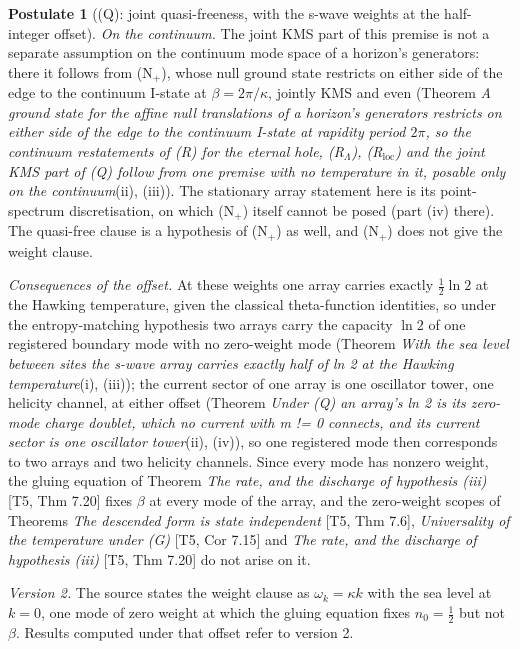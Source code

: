 \documentclass[11pt]{article}
\theoremstyle{definition}
\newtheorem{postulate}[theorem]{Postulate}
\theoremstyle{plain}
\begin{document}
\begin{postulate}[(Q): joint quasi-freeness, with the s-wave weights at the half-integer offset]
\emph{On the continuum.} The joint KMS part of this premise is not a separate assumption on the continuum mode space of a horizon's generators: there it follows from (N$_{+}$), whose null ground state restricts on either side of the edge to the continuum I-state at $\beta = 2\pi/\kappa$, jointly KMS and even (Theorem \emph{A ground state for the affine null translations of a horizon's generators restricts on either side of the edge to the continuum I-state at rapidity period $2\pi$, so the continuum restatements of (R) for the eternal hole, (R$_{\Lambda}$), (R$_{\mathrm{loc}}$) and the joint KMS part of (Q) follow from one premise with no temperature in it, posable only on the continuum}(ii), (iii)). The stationary array statement here is its point-spectrum discretisation, on which (N$_{+}$) itself cannot be posed (part (iv) there). The quasi-free clause is a hypothesis of (N$_{+}$) as well, and (N$_{+}$) does not give the weight clause.

\emph{Consequences of the offset.} At these weights one array carries exactly $\tfrac12\ln 2$ at the Hawking temperature, given the classical theta-function identities, so under the entropy-matching hypothesis two arrays carry the capacity $\ln 2$ of one registered boundary mode with no zero-weight mode (Theorem \emph{With the sea level between sites the s-wave array carries exactly half of ln 2 at the Hawking temperature}(i), (iii)); the current sector of one array is one oscillator tower, one helicity channel, at either offset (Theorem \emph{Under (Q) an array's ln 2 is its zero-mode charge doublet, which no current with m != 0 connects, and its current sector is one oscillator tower}(ii), (iv)), so one registered mode then corresponds to two arrays and two helicity channels. Since every mode has nonzero weight, the gluing equation of Theorem \emph{The rate, and the discharge of hypothesis (iii)} [T5, Thm 7.20] fixes $\beta$ at every mode of the array, and the zero-weight scopes of Theorems \emph{The descended form is state independent} [T5, Thm 7.6], \emph{Universality of the temperature under (G)} [T5, Cor 7.15] and \emph{The rate, and the discharge of hypothesis (iii)} [T5, Thm 7.20] do not arise on it.

\emph{Version 2.} The source states the weight clause as $\omega_k = \kappa k$ with the sea level at $k = 0$, one mode of zero weight at which the gluing equation fixes $n_0 = \tfrac12$ but not $\beta$. Results computed under that offset refer to version 2.
\end{postulate}
\end{document}
